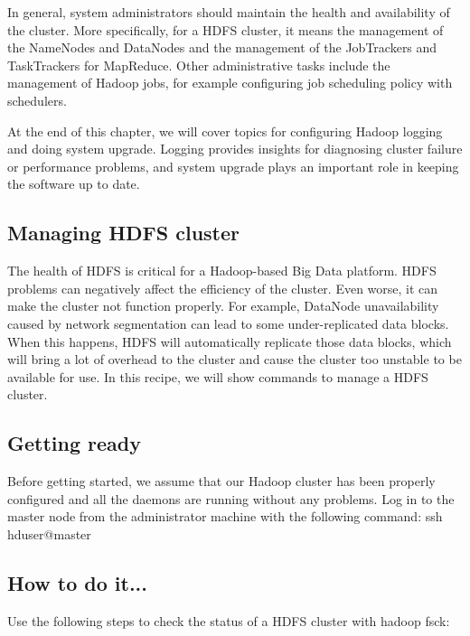 In general, system administrators should maintain the health and availability of the cluster. More specifically, for a HDFS cluster, it means the management of the NameNodes and DataNodes and the management of the JobTrackers and TaskTrackers for MapReduce. Other administrative tasks include the management of Hadoop jobs, for example configuring job scheduling policy with schedulers.

At the end of this chapter, we will cover topics for configuring Hadoop logging and doing system upgrade. Logging provides insights for diagnosing cluster failure or performance problems, and system upgrade plays an important role in keeping the software up to date.

\subsection*{Managing HDFS cluster}
The health of HDFS is critical for a Hadoop-based Big Data platform. HDFS problems can negatively affect the efficiency of the cluster. Even worse, it can make the cluster not function properly. For example, DataNode unavailability caused by network segmentation can lead to some under-replicated data blocks. When this happens, HDFS will automatically replicate those data blocks, which will bring a lot of overhead to the cluster and cause the cluster too unstable to be available for use. In this recipe, we will show commands to manage a HDFS cluster.
\subsection*{Getting ready}
Before getting started, we assume that our Hadoop cluster has been properly configured and all the daemons are running without any problems.
Log in to the master node from the administrator machine with the following command:
ssh hduser@master
\subsection*{How to do it...}
Use the following steps to check the status of a HDFS cluster with hadoop fsck:

